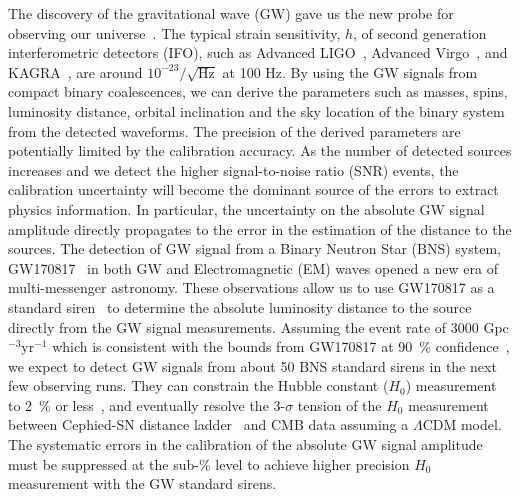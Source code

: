 \documentclass[A4]{spie}  %
\begin{document}
The discovery of the gravitational wave (GW) gave us the new probe for observing our universe~\cite{PhysRevLett.116.061102}. 
The typical strain sensitivity, $h$, of second generation interferometric detectors (IFO), such as Advanced LIGO~\cite{0264-9381-32-7-074001}, Advanced Virgo~\cite{0264-9381-32-2-024001}, and KAGRA~\cite{0264-9381-29-12-124007, PhysRevD.88.043007}, are around $10^{-23}/\sqrt{\mathrm{Hz}}$ at 100 Hz. 
By using the GW signals from compact binary coalescences, we can derive 
the parameters such as masses, spins, luminosity distance, orbital inclination 
and the sky location of the binary system from the detected waveforms. 
The precision of the derived parameters are potentially limited by the 
calibration accuracy. As the number of detected sources increases and we 
detect the higher signal-to-noise ratio (SNR) events, the calibration uncertainty 
will become the dominant source of the errors to extract physics information. 
In particular, the uncertainty on the absolute GW signal amplitude directly 
propagates to the error in the estimation of the distance to the sources. 
The detection of GW signal from a Binary Neutron Star (BNS) system, 
GW170817~\cite{PhysRevLett.119.161101} in both GW and Electromagnetic (EM) 
waves opened a new era of multi-messenger astronomy. These observations 
allow us to use GW170817 as a standard 
siren~\cite{Abbott:2017xzu,Schutz_1986,Holz_2005,Nissanke_2010} to 
determine the absolute luminosity distance to the source directly from the 
GW signal measurements. Assuming the event rate of 3000 Gpc$^{-3}$yr$^{-1}$ 
which is consistent with the bounds from GW170817 at 90~\% 
confidence~\cite{PhysRevLett.119.161101}, 
we expect to detect GW signals from about 
50 BNS standard sirens in the next few observing runs. 
They can constrain the Hubble constant ($H_0$) 
measurement to 2~\% or less~\cite{Feeney:2018mkj}, and eventually resolve 
the 3-$\sigma$ tension of the $H_0$ measurement between Cephied-SN distance 
ladder~\cite{Riess_2016} and CMB data assuming a $\Lambda$CDM 
model.~\cite{2016-planck} The systematic errors in the calibration of 
the absolute GW signal amplitude must be suppressed at the sub-\% level to 
achieve higher precision $H_0$ measurement with the GW standard sirens.

\end{document}
